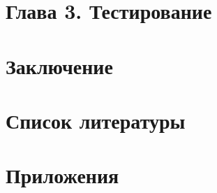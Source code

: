 \documentclass[12pt]{article}
\begin{document}
{		\newpage
		
		\section{Глава 3. Тестирование}
		
		\newpage
		
		\section{Заключение}
		
		\newpage
		
		\section{Список литературы}
		
		\newpage
		
		\section{Приложения}
	}
	
\end{document}
